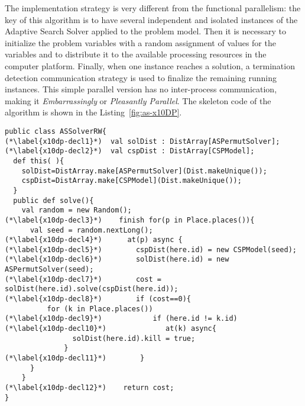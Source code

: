\documentclass{llncs}
\begin{document}
The implementation strategy is very different from the functional
parallelism: the key of this algorithm is to have several independent and
isolated instances of the Adaptive Search Solver applied to the problem
model. Then it is necessary to initialize the problem variables with a random
assignment of values for the variables and to distribute it to the available
processing resources in the computer platform. Finally, when one instance
reaches a solution, a termination detection communication strategy is used to
finalize the remaining running instances. This simple parallel version has no
inter-process communication, making it \emph{Embarrassingly} or
\emph{Pleasantly Parallel}.  The skeleton code of the algorithm is shown in
the Listing~\ref{fig:as-x10DP}.

\begin{lstlisting}[caption={Adaptive Search \emph{data parallel} X10 implementation},label=fig:as-x10DP]
public class ASSolverRW{
(*\label{x10dp-decl1}*)  val solDist : DistArray[ASPermutSolver];
(*\label{x10dp-decl2}*)  val cspDist : DistArray[CSPModel];
  def this( ){
    solDist=DistArray.make[ASPermutSolver](Dist.makeUnique());
    cspDist=DistArray.make[CSPModel](Dist.makeUnique());
  }	
  public def solve(){ 
    val random = new Random();
(*\label{x10dp-decl3}*)    finish for(p in Place.places()){ 
      val seed = random.nextLong();
(*\label{x10dp-decl4}*)      at(p) async {
(*\label{x10dp-decl5}*)        cspDist(here.id) = new CSPModel(seed);
(*\label{x10dp-decl6}*)        solDist(here.id) = new ASPermutSolver(seed);
(*\label{x10dp-decl7}*)        cost = solDist(here.id).solve(cspDist(here.id));
(*\label{x10dp-decl8}*)        if (cost==0){
          for (k in Place.places()) 
(*\label{x10dp-decl9}*)            if (here.id != k.id) 
(*\label{x10dp-decl10}*)              at(k) async{
                solDist(here.id).kill = true;
              }
(*\label{x10dp-decl11}*)        }
      }
    }
(*\label{x10dp-decl12}*)    return cost; 
}
\end{lstlisting}
\end{document}

